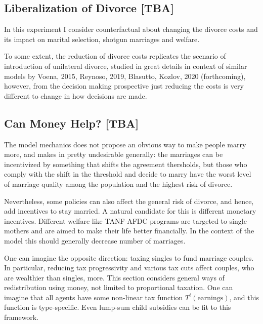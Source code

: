 \documentclass[12pt,letter]{article}
\begin{document}
\subsection{Liberalization of Divorce [TBA]}

In this experiment I consider counterfactual about changing the divorce costs and its impact on marital selection, shotgun marriages and welfare.

To some extent, the reduction of divorce costs replicates the scenario of introduction of unilateral divorce, studied in great details in context of similar models by Voena, 2015, Reynoso, 2019\nocite{reynoso2018impact}, Blasutto, Kozlov, 2020 (forthcoming), however, from the decision making prospective just reducing the costs is very different to change in how decisions are made. %


\subsection{Can Money Help? [TBA]}
The model mechanics does not propose an obvious way to make people marry more, and makes in pretty undesirable generally: the marriages can be incentivized by something that shifts the agreement thersholds, but those who comply with the shift in the threshold and decide to marry have the worst level of marriage quality among the population and the highest risk of divorce.

Nevertheless, some policies can also affect the general risk of divorce, and hence, add incentives to stay married. A natural candidate for this is different monetary incentives. Different welfare like TANF-AFDC programs are targeted to single mothers and are aimed to make their life better financially. In the context of the model this should generally decrease number of marriages.

One can imagine the opposite direction: taxing singles to fund marriage couples. In particular, reducing tax progressivity and various tax cuts affect couples, who are wealthier than singles, more. This section considers general ways of redistribution using money, not limited to proportional taxation. One can imagine that all agents have some non-linear tax function $T^{i}(\text{earnings})$, and this function is type-specific. Even lump-sum child subsidies can be fit to this framework.
\end{document}

